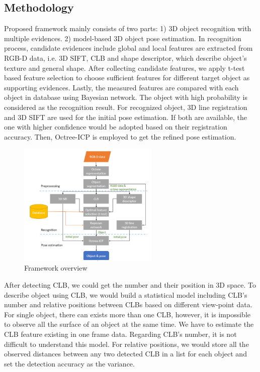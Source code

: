 \documentclass{ieeeaccess}
\begin{document}
\subsection{Methodology}
Proposed framework mainly consists of two parts: 1) 3D
object recognition with multiple evidences. 2) model-based
3D object pose estimation. In recognition process, candidate
evidences include global and local features are extracted from
RGB-D data, i.e. 3D SIFT, CLB and shape descriptor, which
describe object’s texture and general shape. After
collecting candidate features, we apply t-test based feature
selection to choose sufficient features for different target
object as supporting evidences. Lastly, the measured features
are compared with each object in database using Bayesian
network. The object with high probability is considered as the
recognition result. For recognized object, 3D line registration
and 3D SIFT are used for the initial pose estimation. If both
are available, the one with higher confidence would be
adopted based on their registration accuracy. Then,
Octree-ICP is employed to get the refined pose estimation.

\begin{figure}[t!]
\centering
\includegraphics[width=0.6\textwidth]{bayesian_framework.png}
\caption{Framework overview}
\end{figure}

After detecting CLB, we could get the number and their
position in 3D space. To describe object using CLB, we would
build a statistical model including CLB’s number and relative
positions between CLBs based on different view-point data.
For single object, there can exists more than one CLB,
however, it is impossible to observe all the surface of an object
at the same time. We have to estimate the CLB feature existing
in one frame data. Regarding CLB’s number, it is not difficult
to understand this model. For relative positions, we would
store all the observed distances between any two detected
CLB in a list for each object and set the detection accuracy as
the variance.
\end{document}
